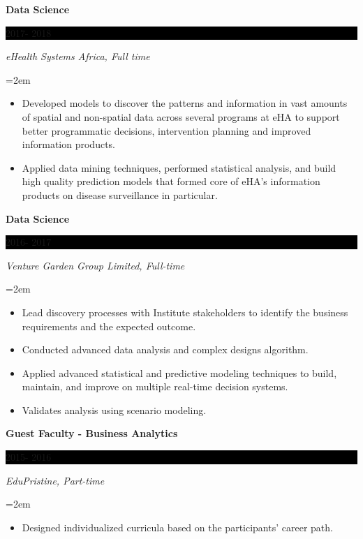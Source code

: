 \documentclass[paper=a4,fontsize=10pt]{scrartcl} %
\newcommand{\sepspace}{\vspace*{1em}}       %
\newcommand{\EducationEntry}[4]{
        \noindent \textbf{#1} \hfill      %
        \colorbox{Black}{%
            \parbox{6em}{%
            \hfill\color{White}#2}} \par  %
        \noindent \textit{#3} \par        %
        \noindent\hangindent=2em\hangafter=0 \small #4 %
        \normalsize \par}
\begin{document}
\EducationEntry{Data Science}{2017- 2018}{eHealth Systems Africa, Full time}{
	\begin{itemize}
		\item	Developed models to discover the patterns and information in vast amounts of spatial and non-spatial data across several programs at eHA to support better programmatic decisions, intervention planning and improved information products.
		\item	Applied data mining techniques, performed statistical analysis, and build high quality prediction models that formed core of eHA's information products on disease surveillance in particular.
		
\end{itemize}}
\sepspace

\EducationEntry{Data Science}{2016- 2017}{Venture Garden Group Limited, Full-time}{
	\begin{itemize}
\item	Lead discovery processes with Institute stakeholders to identify the business requirements and the expected outcome.
\item	Conducted advanced data analysis and complex designs algorithm.
	\item Applied advanced statistical and predictive modeling techniques to build, maintain, and improve on multiple real-time decision systems.
\item 	Validates analysis using scenario modeling.
	\end{itemize}}
\sepspace

\EducationEntry{Guest Faculty - Business Analytics}{2015- 2016}{EduPristine, Part-time}{
	\begin{itemize}
		\item Designed individualized curricula based on the participants' career path.
	\end{itemize}}
	
\sepspace
\end{document}
